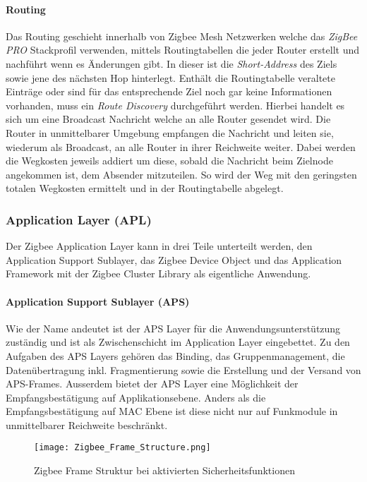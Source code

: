 \paragraph{Routing}
Das Routing geschieht innerhalb von Zigbee Mesh Netzwerken welche das \textit{ZigBee PRO} Stackprofil verwenden, mittels Routingtabellen die jeder Router erstellt und nachführt wenn es Änderungen gibt.
In dieser ist die \textit{Short-Address} des Ziels sowie jene des nächsten Hop hinterlegt.
Enthält die Routingtabelle veraltete Einträge oder sind für das entsprechende Ziel noch gar keine Informationen vorhanden, muss ein \textit{Route Discovery} durchgeführt werden.
Hierbei handelt es sich um eine Broadcast Nachricht welche an alle Router gesendet wird.
Die Router in unmittelbarer Umgebung empfangen die Nachricht und leiten sie, wiederum als Broadcast, an alle Router in ihrer Reichweite weiter.
Dabei werden die Wegkosten jeweils addiert um diese, sobald die Nachricht beim Zielnode angekommen ist, dem Absender mitzuteilen.
So wird der Weg mit den geringsten totalen Wegkosten ermittelt und in der Routingtabelle abgelegt.


\subsubsection{Application Layer (APL)}\label{subsubsec:ApplicationLayer}
Der Zigbee Application Layer kann in drei Teile unterteilt werden, den Application Support Sublayer, das Zigbee Device Object und das Application Framework mit der Zigbee Cluster Library als eigentliche Anwendung.

\paragraph{Application Support Sublayer (APS)}
Wie der Name andeutet ist der APS Layer für die Anwendungsunterstützung zuständig und ist als Zwischenschicht im Application Layer eingebettet.
Zu den Aufgaben des APS Layers gehören das Binding, das Gruppenmanagement, die Datenübertragung inkl. Fragmentierung sowie die Erstellung und der Versand von APS-Frames.
Ausserdem bietet der APS Layer eine Möglichkeit der Empfangsbestätigung auf Applikationsebene.
Anders als die Empfangsbestätigung auf MAC Ebene ist diese nicht nur auf Funkmodule in unmittelbarer Reichweite beschränkt.

\begin{figure}[h]
	\centering
	\texttt{[image: Zigbee\_Frame\_Structure.png]}
	\caption{Zigbee Frame Struktur bei aktivierten Sicherheitsfunktionen \cite[S.~286]{markus_krause_rainer_konrad_zigbee_2014}}
	\label{fig:ZigbeeFrameStruktur}
\end{figure}

